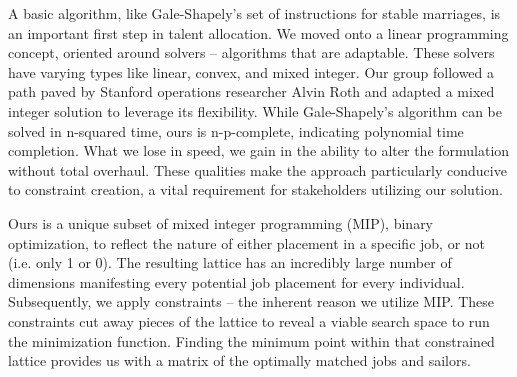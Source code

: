 A basic algorithm, like Gale-Shapely’s set of instructions for stable marriages, is an important first step in talent allocation. We moved onto a linear programming concept, oriented around solvers -- algorithms that are adaptable.  These solvers have varying types like linear, convex, and mixed integer.  Our group followed a path paved by Stanford operations researcher Alvin Roth and adapted a mixed integer solution to leverage its flexibility.  While Gale-Shapely’s algorithm can be solved in n-squared time, ours is n-p-complete, indicating polynomial time completion. What we lose in speed, we gain in the ability to alter the formulation without total overhaul.  These qualities make the approach particularly conducive to constraint creation, a vital requirement for stakeholders utilizing our solution.  

Ours is a unique subset of mixed integer programming (MIP), binary optimization, to reflect the nature of either placement in a specific job, or not (i.e. only 1 or 0). The resulting lattice has an incredibly large number of dimensions manifesting every potential job placement for every individual.  Subsequently, we apply constraints -- the inherent reason we utilize MIP.  These constraints cut away pieces of the lattice to reveal a viable search space to run the minimization function.  Finding the minimum point within that constrained lattice provides us with a matrix of the optimally matched jobs and sailors.  

